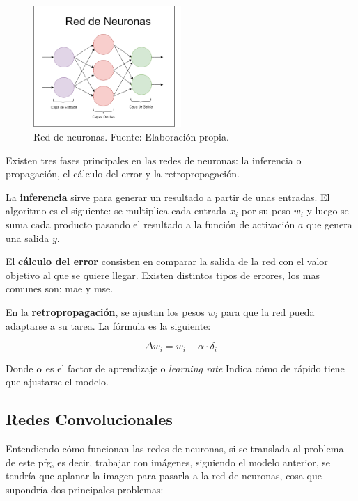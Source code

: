 \begin{figure}[H]
	\centering
	\includegraphics[width=0.5\textwidth]{figures/neural_network.png}
	\caption{\label{fig:neuralnetwork}Red de neuronas. Fuente: Elaboración propia.}
\end{figure}

Existen tres fases principales en las redes de neuronas: la inferencia o propagación, el cálculo del error y la retropropagación. 

La \textbf{inferencia} sirve para generar un resultado a partir de unas entradas. El algoritmo es el siguiente: se multiplica cada entrada $x_i$ por su peso $w_i$ y luego se suma cada producto pasando el resultado a la función de activación $a$ que genera una salida $y$. 

El \textbf{cálculo del error} consisten en comparar la salida de la red con el valor objetivo al que se quiere llegar. Existen distintos tipos de errores, los mas comunes son: \gls{mae} y \gls{mse}.

En la \textbf{retropropagación}, se ajustan los pesos $w_i$ para que la red pueda adaptarse a su tarea\cite{goodfellow}. La fórmula es la siguiente:

\begin{equation}
	\varDelta w_i = w_i-\alpha·\delta_i\label{eq:backpropagation}
\end{equation}

Donde $\alpha$ es el factor de aprendizaje o \textit{learning rate} Indica cómo de rápido tiene que ajustarse el modelo.

\subsection{Redes Convolucionales}

\quad Entendiendo cómo funcionan las redes de neuronas, si se translada al problema de este \gls{pfg}, es decir, trabajar con imágenes, siguiendo el modelo anterior, se tendría que aplanar la imagen para pasarla a la red de neuronas, cosa que supondría dos principales problemas:

